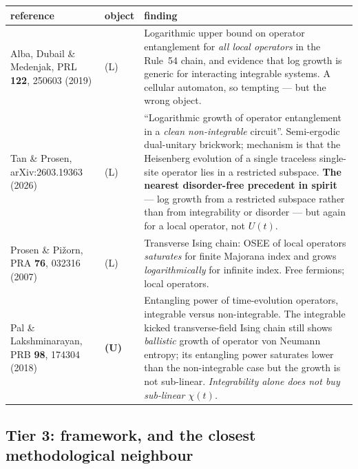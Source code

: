 \documentclass[11pt]{article}
\theoremstyle{plain}
\theoremstyle{remark}
\begin{document}
\begin{longtable}{p{}p{}p{}}
\toprule
reference & object & finding \\
\midrule
\endhead
Alba, Dubail \& Medenjak, PRL \textbf{122}, 250603 (2019) & (L) &
  Logarithmic upper bound on operator entanglement for \emph{all local
  operators} in the Rule~54 chain, and evidence that log growth is generic for
  interacting integrable systems. A cellular automaton, so tempting --- but the
  wrong object. \\
\addlinespace
Tan \& Prosen, arXiv:2603.19363 (2026) & (L) &
  ``Logarithmic growth of operator entanglement in a \emph{clean non-integrable}
  circuit''. Semi-ergodic dual-unitary brickwork; mechanism is that the
  Heisenberg evolution of a single traceless single-site operator lies in a
  restricted subspace. \textbf{The nearest disorder-free precedent in spirit}
  --- log growth from a restricted subspace rather than from integrability or
  disorder --- but again for a local operator, not $U(t)$. \\
\addlinespace
Prosen \& Pi\v{z}orn, PRA \textbf{76}, 032316 (2007) & (L) &
  Transverse Ising chain: OSEE of local operators \emph{saturates} for finite
  Majorana index and grows \emph{logarithmically} for infinite index. Free
  fermions; local operators. \\
\addlinespace
Pal \& Lakshminarayan, PRB \textbf{98}, 174304 (2018) & \textbf{(U)} &
  Entangling power of time-evolution operators, integrable versus
  non-integrable. The integrable kicked transverse-field Ising chain still shows
  \emph{ballistic} growth of operator von Neumann entropy; its entangling power
  saturates lower than the non-integrable case but the growth is not sub-linear.
  \emph{Integrability alone does not buy sub-linear $\chi(t)$.} \\
\bottomrule
\end{longtable}

\subsection{Tier 3: framework, and the closest methodological neighbour}
\end{document}
